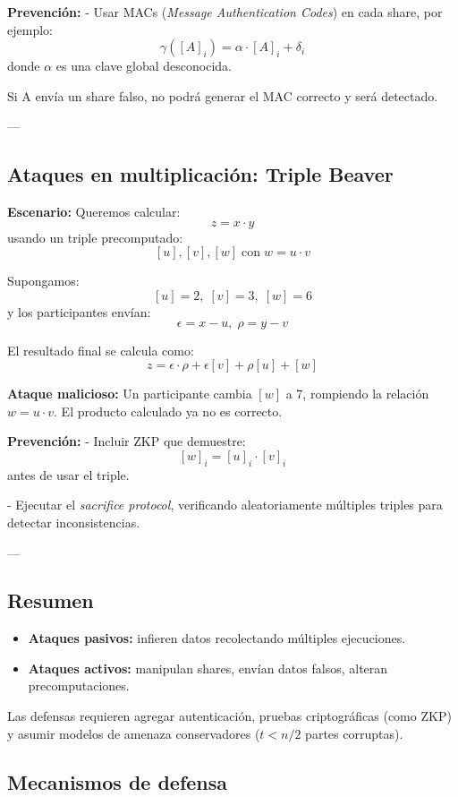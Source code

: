 \documentclass{article}
\begin{document}
\textbf{Prevención:}  
- Usar MACs (\textit{Message Authentication Codes}) en cada share, por ejemplo:
\[
\gamma([A]_i) = \alpha \cdot [A]_i + \delta_i
\]
donde \( \alpha \) es una clave global desconocida.

Si A envía un share falso, no podrá generar el MAC correcto y será detectado.

---

\subsection{Ataques en multiplicación: Triple Beaver}

\textbf{Escenario:} Queremos calcular:
\[
z = x \cdot y
\]
usando un triple precomputado:
\[
[u], [v], [w] \; \text{con} \; w = u \cdot v
\]

Supongamos:
\[
[u] = 2, \; [v] = 3, \; [w] = 6
\]
y los participantes envían:
\[
\epsilon = x - u, \; \rho = y - v
\]

El resultado final se calcula como:
\[
z = \epsilon \cdot \rho + \epsilon [v] + \rho [u] + [w]
\]

\textbf{Ataque malicioso:} Un participante cambia \( [w] \) a 7, rompiendo la relación \( w = u \cdot v \). El producto calculado ya no es correcto.

\textbf{Prevención:}  
- Incluir ZKP que demuestre:
\[
[w]_i = [u]_i \cdot [v]_i
\]
antes de usar el triple.

- Ejecutar el \textit{sacrifice protocol}, verificando aleatoriamente múltiples triples para detectar inconsistencias.

---

\subsection{Resumen}

\begin{itemize}
    \item \textbf{Ataques pasivos:} infieren datos recolectando múltiples ejecuciones.
    \item \textbf{Ataques activos:} manipulan shares, envían datos falsos, alteran precomputaciones.
\end{itemize}

Las defensas requieren agregar autenticación, pruebas criptográficas (como ZKP) y asumir modelos de amenaza conservadores (\( t < n/2 \) partes corruptas).

\subsection{Mecanismos de defensa}
\end{document}

